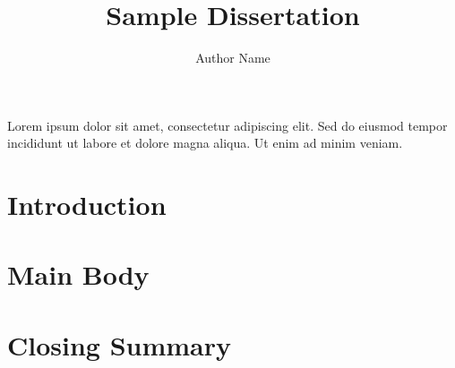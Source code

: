 \documentclass{ufdissertation}
\title{Sample Dissertation}
\author{Author Name}
\begin{document}
\fontsize{14pt}{16pt}\selectfont
Lorem ipsum dolor sit amet, consectetur adipiscing elit. Sed do
eiusmod tempor incididunt ut labore et dolore magna aliqua. Ut enim
ad minim veniam.
\chapter{Introduction}
\chapter{Main Body}
\chapter{Closing Summary}
\end{document}
